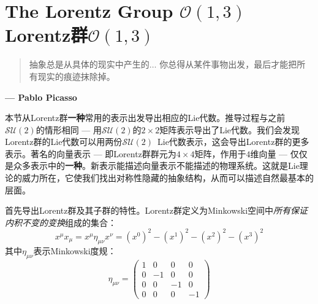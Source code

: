 \section[Lorentz群]{The Lorentz Group $\mathcal{O}(1, 3)$ \quad Lorentz群$\mathcal{O}(1, 3)$}
\label{sec3.7}

\begin{quote}
抽象总是从具体的现实中产生的$\dots$ 你总得从某件事物出发，最后才能把所有现实的痕迹抹除掉。
\end{quote}

\begin{flushright}
{\bf  --- Pablo Picasso}
\end{flushright}

本节从Lorentz群{\bf 一种}常用的表示出发导出相应的Lie代数。推导过程与之前$\mathcal{SU}(2)$的情形相同 --- 用$\mathcal{SU}(2)$的$2 \times 2$矩阵表示导出了Lie代数。我们会发现Lorentz群的Lie代数可以用两份$\mathcal{SU}(2)$\ Lie代数表示，这会导出Lorentz群的更多表示。著名的向量表示 --- 即Lorentz群群元为$4 \times 4$矩阵，作用于$4$维向量 --- 仅仅是众多表示中的{\bf 一种}。新表示能描述向量表示不能描述的物理系统。这就是Lie理论的威力所在，它使我们找出对称性隐藏的抽象结构，从而可以描述自然最基本的层面。

首先导出Lorentz群及其子群的特性。Lorentz群定义为Minkowski空间中{\it 所有保证内积不变的变换}组成的集合：
\begin{equation}
\label{equ3.122}
x^\mu x_\mu = x^\mu \eta_{\mu \nu} x^\nu = (x^0)^2 - (x^1)^2 - (x^2)^2 - (x^3)^2
\end{equation}
其中$\eta_{\mu \nu}$表示Minkowski度规：
\begin{equation}
\label{equ3.123}
\eta_{\mu \nu} =
	\begin{pmatrix}
		1 & 0 & 0 & 0 \\
		0 & -1 & 0 & 0 \\
		0 & 0 & -1 & 0 \\
		0 & 0 & 0 & -1
	\end{pmatrix}
\end{equation}

